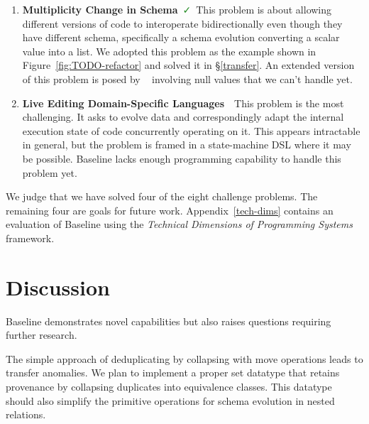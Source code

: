 \documentclass[english,submission]{programming}
\theoremstyle{definition}
\newcommand{\redCross}{\textcolor{red}{\ \faTimes\ }}
\newcommand{\greenCheck}{\textcolor{ForestGreen}{\ \faCheck\ }}
\begin{document}
\begin{enumerate}
  \item \textbf{Multiplicity Change in Schema}\greenCheck This problem is about allowing different versions of code to interoperate bidirectionally even though they have different schema, specifically a schema evolution converting a scalar value into a list. We adopted this problem as the example shown in Figure~\ref{fig:TODO-refactor} and solved it in \S\ref{transfer}. An extended version of this problem is posed by \citeauthor*{Cambria}~\cite[Appendex III]{Cambria} involving null values that we can't handle yet.

  \item \textbf{Live Editing Domain-Specific Languages}\redCross This problem is the most challenging. It asks to evolve data and correspondingly adapt the internal execution state of code concurrently operating on it. This appears intractable in general, but the problem is framed in a state-machine DSL where it may be possible. Baseline lacks enough programming capability to handle this problem yet.

\end{enumerate}

We judge that we have solved four of the eight challenge problems. The remaining four are goals for future work. Appendix~\ref{tech-dims} contains an evaluation of Baseline using the \textit{Technical Dimensions of Programming Systems}~\cite{techdims} framework.



\section{Discussion}\label{discussion}

Baseline demonstrates novel capabilities but also raises questions requiring further research.



The simple approach of deduplicating by collapsing with \textsf{move} operations leads to transfer anomalies. We plan to implement a proper set datatype that retains provenance by collapsing duplicates into equivalence classes. This datatype should also simplify the primitive operations for schema evolution in nested relations.
\end{document}

